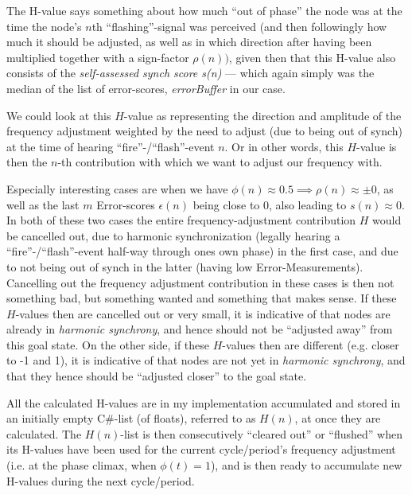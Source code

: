 			The H-value says something about how much ``out of phase'' the node was at the time the node's $n$th ``flashing''-signal was perceived (and then followingly how much it should be adjusted, as well as in which direction after having been multiplied together with a sign-factor $\rho(n))$, given then that this H-value also consists of the \textit{self-assessed synch score s(n)} — which again simply was the median of the list of error-scores, \textit{errorBuffer} in our case.
			
			We could look at this $H$-value as representing the direction and amplitude of the frequency adjustment weighted by the need to adjust (due to being out of synch) at the time of hearing ``fire''-/``flash''-event $n$. Or in other words, this $H$-value is then the $n$-th contribution with which we want to adjust our frequency with.
			
			Especially interesting cases are when we have $\phi(n)\approx0.5 \implies \rho(n)\approx\pm0$, as well as the last $m$ Error-scores $\epsilon(n)$ being close to 0, also leading to $s(n)\approx0$. In both of these two cases the entire frequency-adjustment contribution $H$ would be cancelled out, due to harmonic synchronization (legally hearing a ``fire''-/``flash''-event half-way through ones own phase) in the first case, and due to not being out of synch in the latter (having low Error-Measurements). Cancelling out the frequency adjustment contribution in these cases is then not something bad, but something wanted and something that makes sense. If these $H$-values then are cancelled out or very small, it is indicative of that nodes are already in \textit{harmonic synchrony}, and hence should not be ``adjusted away'' from this goal state. On the other side, if these $H$-values then are different (e.g. closer to -1 and 1), it is indicative of that nodes are not yet in \textit{harmonic synchrony}, and that they hence should be ``adjusted closer'' to the goal state.
			
			All the calculated H-values are in my implementation accumulated and stored in an initially empty C\#-list (of floats), referred to as $H(n)$, at once they are calculated. The $H(n)$-list is then consecutively ``cleared out'' or ``flushed'' when its H-values have been used for the current cycle/period's frequency adjustment (i.e. at the phase climax, when $\phi(t)=1$), and is then ready to accumulate new H-values during the next cycle/period.
			
			
